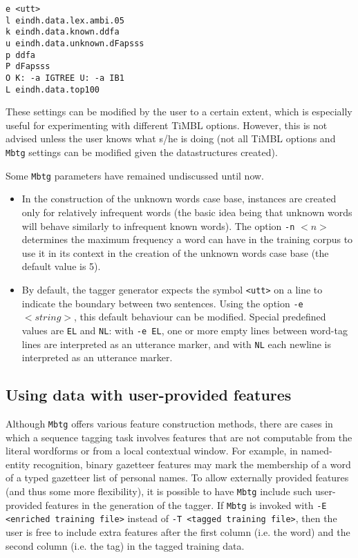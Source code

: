 \documentclass{report}
\begin{document}
{\small
\begin{verbatim}
e <utt>
l eindh.data.lex.ambi.05
k eindh.data.known.ddfa
u eindh.data.unknown.dFapsss
p ddfa
P dFapsss
O K: -a IGTREE U: -a IB1
L eindh.data.top100
\end{verbatim}
}

These settings can be modified by the user to a certain extent, which
is especially useful for experimenting with different TiMBL
options. However, this is not advised unless the user knows what s/he
is doing (not all TiMBL options and {\tt Mbtg} settings can be
modified given the datastructures created).

Some {\tt Mbtg} parameters have remained undiscussed until now. 

\begin{itemize}
\item In the construction of the unknown words case base, instances
  are created only for relatively infrequent words
  (the basic idea being that unknown words will behave similarly to
  infrequent known words).  The option {\tt -n} $<n>$ determines the
  maximum frequency a word can have in the training corpus to use it
  in its context in the creation of the unknown words case base
  (the default value is 5).
\item By default, the tagger generator expects the symbol {\tt <utt>}
  on a line to indicate the boundary between two sentences.  Using the
  option {\tt -e} $<string>$, this default behaviour can be
  modified. Special predefined values are {\tt EL} and {\tt NL}: with
  {\tt -e EL}, one or more empty lines between word-tag lines are
  interpreted as an utterance marker, and with {\tt NL} each newline
  is interpreted as an utterance marker.
\end{itemize}

\subsection{Using data with user-provided features}
\label{userprovided-mbtg}

Although {\tt Mbtg} offers various feature construction methods, there
are cases in which a sequence tagging task involves features that are
not computable from the literal wordforms or from a local contextual
window. For example, in named-entity recognition, binary gazetteer
features may mark the membership of a word of a typed gazetteer list
of personal names. To allow externally provided features (and thus
some more flexibility), it is possible to have {\tt Mbtg} include such
user-provided features in the generation of the tagger. If {\tt Mbtg}
is invoked with {\tt -E <enriched training file>} instead of {\tt -T
  <tagged training file>}, then the user is free to include extra
features after the first column (i.e. the word) and the second column
(i.e. the tag) in the tagged training data.
\end{document}
